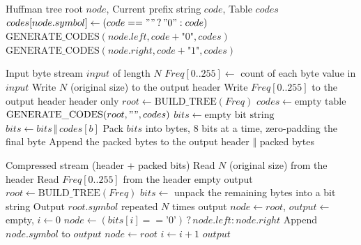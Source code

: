 \documentclass{article}
\begin{document}
\begin{algorithm}[H]
\caption{Generate Prefix Codes (Recursive Tree Traversal)}
\label{alg:huffman_generate_codes}
\begin{algorithmic}[1]
\REQUIRE Huffman tree root $node$, Current prefix string $code$, Table $codes$
    \RETURN
\ENDIF
{}
    \STATE $codes[node.symbol] \gets (code == "" \,?\, "0" : code)$
    \RETURN
\ENDIF
\STATE $\text{GENERATE\_CODES}(node.left, code + \text{"0"}, codes)$
\STATE $\text{GENERATE\_CODES}(node.right, code + \text{"1"}, codes)$
\end{algorithmic}
\end{algorithm}

\begin{algorithm}[H]
\caption{Huffman Compression}
\label{alg:huffman_compress}
\begin{algorithmic}[1]
\REQUIRE Input byte stream $input$ of length $N$
\STATE $Freq[0..255] \gets$ count of each byte value in $input$
\STATE Write $N$ (original size) to the output header
\STATE Write $Freq[0..255]$ to the output header
    \RETURN header only
\ENDIF
\STATE $root \gets \text{BUILD\_TREE}(Freq)$
\STATE $codes \gets \text{empty table}$
\STATE $\text{GENERATE\_CODES}(root, "", codes)$
\STATE $bits \gets \text{empty bit string}$
    \STATE $bits \gets bits \,\Vert\, codes[b]$
\ENDFOR
\STATE Pack $bits$ into bytes, $8$ bits at a time, zero-padding the final byte
\STATE Append the packed bytes to the output
\RETURN header $\Vert$ packed bytes
\end{algorithmic}
\end{algorithm}

\begin{algorithm}[H]
\caption{Huffman Decompression}
\label{alg:huffman_decompress}
\begin{algorithmic}[1]
\REQUIRE Compressed stream (header + packed bits)
\STATE Read $N$ (original size) from the header
\STATE Read $Freq[0..255]$ from the header
    \RETURN empty output
\ENDIF
\STATE $root \gets \text{BUILD\_TREE}(Freq)$
\STATE $bits \gets$ unpack the remaining bytes into a bit string
    \STATE Output $root.symbol$ repeated $N$ times
    \RETURN output
\ENDIF
\STATE $node \gets root$, $output \gets$ empty, $i \gets 0$
    \STATE $node \gets (bits[i] == \text{'0'}) \,?\, node.left : node.right$
        \STATE Append $node.symbol$ to $output$
        \STATE $node \gets root$
    \ENDIF
    \STATE $i \gets i + 1$
\ENDWHILE
\RETURN $output$
\end{algorithmic}
\end{algorithm}
\end{document}
